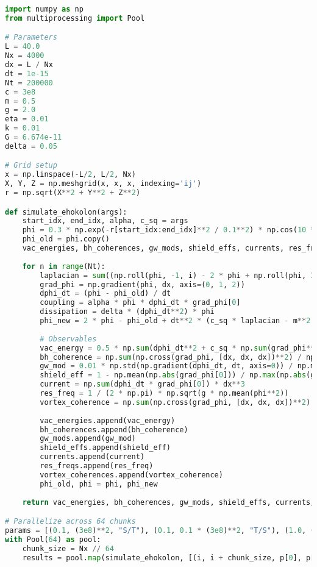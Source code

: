 \documentclass[11pt]{article}
\begin{document}
\begin{lstlisting}[language=Python, caption={Fluxonic Zero-Point Energy Simulation}, label=lst:simulation]
import numpy as np
from multiprocessing import Pool

# Parameters
L = 40.0
Nx = 4000
dx = L / Nx
dt = 1e-15
Nt = 200000
c = 3e8
m = 0.5
g = 2.0
eta = 0.01
k = 0.01
G = 6.674e-11
delta = 0.05

# Grid setup
x = np.linspace(-L/2, L/2, Nx)
X, Y, Z = np.meshgrid(x, x, x, indexing='ij')
r = np.sqrt(X**2 + Y**2 + Z**2)

def simulate_ehokolon(args):
    start_idx, end_idx, alpha, c_sq = args
    phi = 0.3 * np.exp(-r[start_idx:end_idx]**2 / 0.1**2) * np.cos(10 * X[start_idx:end_idx]) + 0.1 * np.random.rand(Nx//64, Nx, Nx)
    phi_old = phi.copy()
    vac_energies, bh_coherences, gw_mods, shield_effs, currents, res_freqs, vortex_coherences = [], [], [], [], [], [], []
    
    for n in range(Nt):
        laplacian = sum((np.roll(phi, -1, i) - 2 * phi + np.roll(phi, 1, i)) / dx**2 for i in range(3))
        grad_phi = np.gradient(phi, dx, axis=(0, 1, 2))
        dphi_dt = (phi - phi_old) / dt
        coupling = alpha * phi * dphi_dt * grad_phi[0]
        dissipation = delta * (dphi_dt**2) * phi
        phi_new = 2 * phi - phi_old + dt**2 * (c_sq * laplacian - m**2 * phi - g * phi**3 - eta * phi**5 + coupling - dissipation)
        
        # Observables
        vac_energy = 0.5 * np.sum(dphi_dt**2 + c_sq * np.sum(grad_phi**2, axis=0) + m**2 * phi**2 + g * phi**4 + eta * phi**6) * dx**3
        bh_coherence = np.sum(np.cross(grad_phi, [dx, dx, dx])**2) / np.sum(grad_phi**2) * dx**3
        gw_mod = 0.01 * np.std(np.gradient(dphi_dt, dt, axis=0)) / np.mean(np.gradient(dphi_dt, dt, axis=0))
        shield_eff = 1 - np.mean(np.abs(grad_phi[0])) / np.max(np.abs(grad_phi[0]))
        current = np.sum(dphi_dt * grad_phi[0]) * dx**3
        res_freq = 1 / (2 * np.pi) * np.sqrt(g * np.mean(phi**2))
        vortex_coherence = np.sum(np.cross(grad_phi, [dx, dx, dx])**2) / np.sum(grad_phi**2) * dx**3
        
        vac_energies.append(vac_energy)
        bh_coherences.append(bh_coherence)
        gw_mods.append(gw_mod)
        shield_effs.append(shield_eff)
        currents.append(current)
        res_freqs.append(res_freq)
        vortex_coherences.append(vortex_coherence)
        phi_old, phi = phi, phi_new
    
    return vac_energies, bh_coherences, gw_mods, shield_effs, currents, res_freqs, vortex_coherences

# Parallelize across 64 chunks
params = [(0.1, (3e8)**2, "S/T"), (0.1, 0.1 * (3e8)**2, "T/S"), (1.0, (3e8)**2, "S=T")]
with Pool(64) as pool:
    chunk_size = Nx // 64
    results = pool.map(simulate_ehokolon, [(i, i + chunk_size, p[0], p[1]) for i in range(0, Nx, chunk_size) for p in params])
\end{lstlisting}
\end{document}
